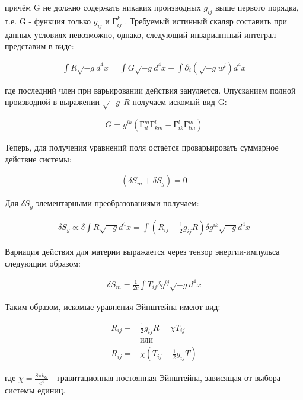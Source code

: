 \documentclass[a4paper,14pt]{article}
\begin{document}
	причём G не должно содержать никаких производных $ g_{ij} $ выше первого порядка, т.е. G - функция только $ g_{ij} $ и $ Г_{ij}^k $ . Требуемый истинный скаляр составить при данных условиях невозможно, однако, следующий инвариантный интеграл представим в виде:

	\begin{align*}
		\int R \sqrt{-g} d^4 x = \int G \sqrt{-g} d^4 x + \int \partial_i ( \sqrt{-g} w^i ) d^4 x
	\end{align*}

	где последний член при варьировании действия зануляется. Опусканием полной производной в выражении $ \sqrt{-g} \: R $ получаем искомый вид G:

	\begin{align*}
		G = g^{ik} ( Г_{il}^m Г_{km}^l - Г_{ik}^l Г_{lm}^m )
	\end{align*}

	Теперь, для получения уравнений поля остаётся проварьировать суммарное действие системы:

	\begin{align*}
		( \delta S_m + \delta S_g ) = 0
	\end{align*}

	Для $ \delta S_g $ элементарными преобразованиями получаем:

	\begin{align*}
		\delta S_g \propto \delta \int R \sqrt{-g} d^4 x =  \int ( R_{ij} - \frac{1}{2} g_{ij} R) \delta g^{ik} \sqrt{-g} d^4 x
	\end{align*}


	Вариация действия для материи выражается через тензор энергии-импульса следующим образом: 

	\begin{align*}
		\delta S_m = \frac{1}{2c} \int T_{ij} \delta g^{ij} \sqrt{-g} d^4 x
	\end{align*}

	Таким образом, искомые уравнения Эйнштейна имеют вид:

	\begin{align*}
		R_{ij} - & \frac{1}{2} g_{ij} R = \chi T_{ij} \\
		& или               \\
		R_{ij} = & \chi ( T_{ij} - \frac{1}{2} g_{ij} T )
	\end{align*}

	где $\chi = \frac{8 \pi k_G }{ c^4 }$ - гравитационная постоянная Эйнштейна, зависящая от выбора системы единиц. \\
\end{document}
